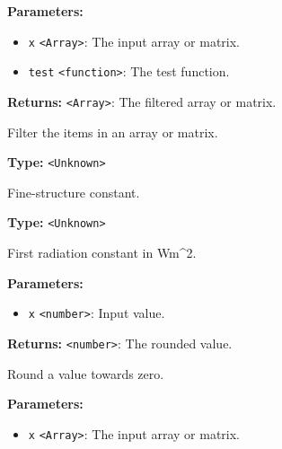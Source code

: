 \documentclass[12pt,a4paper]{article}
\begin{document}
\noindent \textbf{Parameters:}
\begin{itemize}
  \item \texttt{x} \texttt{<Array>}: The input array or matrix.
  \item \texttt{test} \texttt{<function>}: The test function.
\end{itemize}

\noindent \textbf{Returns:} \texttt{<Array>}: The filtered array or matrix.

\noindent Filter the items in an array or matrix.

\vspace{5mm}
\noindent {}\vspace{4mm}


\noindent \textbf{Type:} \texttt{<Unknown>}

\noindent Fine-structure constant.

\vspace{5mm}
\noindent {}\vspace{4mm}


\noindent \textbf{Type:} \texttt{<Unknown>}

\noindent First radiation constant in Wm\textasciicircum{}2.

\vspace{5mm}
\noindent {}


\noindent \textbf{Parameters:}
\begin{itemize}
  \item \texttt{x} \texttt{<number>}: Input value.
\end{itemize}

\noindent \textbf{Returns:} \texttt{<number>}: The rounded value.

\noindent Round a value towards zero.

\vspace{5mm}
\noindent {}


\noindent \textbf{Parameters:}
\begin{itemize}
  \item \texttt{x} \texttt{<Array>}: The input array or matrix.
\end{itemize}
\end{document}
